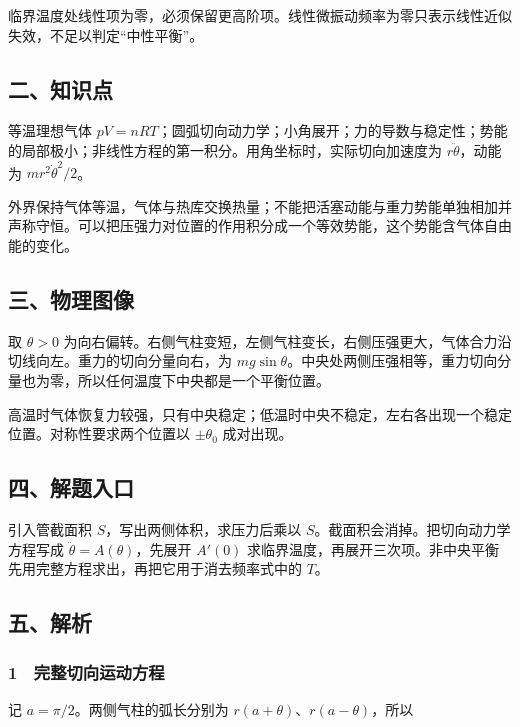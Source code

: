 \documentclass[12pt,a4paper,fontset=fandol]{ctexart}
\begin{document}
临界温度处线性项为零，必须保留更高阶项。线性微振动频率为零只表示线性近似失效，不足以判定``中性平衡''。

\subsection{二、知识点}\label{ux4e8cux77e5ux8bc6ux70b9-1}

等温理想气体
\(pV=nRT\)；圆弧切向动力学；小角展开；力的导数与稳定性；势能的局部极小；非线性方程的第一积分。用角坐标时，实际切向加速度为
\(r\ddot\theta\)，动能为 \(mr^2\dot\theta^2/2\)。

外界保持气体等温，气体与热库交换热量；不能把活塞动能与重力势能单独相加并声称守恒。可以把压强力对位置的作用积分成一个等效势能，这个势能含气体自由能的变化。

\subsection{三、物理图像}\label{ux4e09ux7269ux7406ux56feux50cf-1}

取 \(\theta>0\)
为向右偏转。右侧气柱变短，左侧气柱变长，右侧压强更大，气体合力沿切线向左。重力的切向分量向右，为
\(mg\sin\theta\)。中央处两侧压强相等，重力切向分量也为零，所以任何温度下中央都是一个平衡位置。

高温时气体恢复力较强，只有中央稳定；低温时中央不稳定，左右各出现一个稳定位置。对称性要求两个位置以
\(\pm\theta_0\) 成对出现。

\subsection{四、解题入口}\label{ux56dbux89e3ux9898ux5165ux53e3-1}

引入管截面积 \(S\)，写出两侧体积，求压力后乘以
\(S\)。截面积会消掉。把切向动力学方程写成
\(\ddot\theta=A(\theta)\)，先展开 \(A'(0)\)
求临界温度，再展开三次项。非中央平衡先用完整方程求出，再把它用于消去频率式中的
\(T\)。

\subsection{五、解析}\label{ux4e94ux89e3ux6790-1}

\subsubsection{1　完整切向运动方程}\label{ux5b8cux6574ux5207ux5411ux8fd0ux52a8ux65b9ux7a0b}

记 \(a=\pi/2\)。两侧气柱的弧长分别为
\(r(a+\theta)\)、\(r(a-\theta)\)，所以
\end{document}
